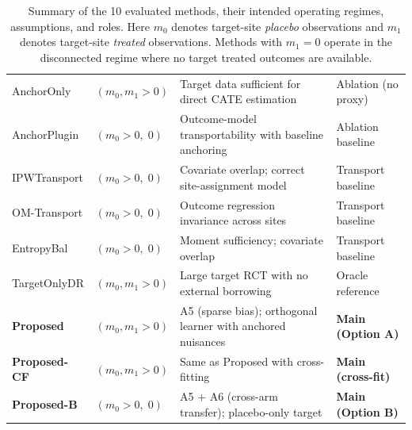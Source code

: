 {{\begin{table}[t]
\begin{tabular}{p{2.8cm} p{2.4cm} p{5.5cm} p{2.8cm}}
AnchorOnly
& $(m_0, m_1 > 0)$
& Target data sufficient for direct CATE estimation
& Ablation (no proxy)
\\

AnchorPlugin
& $(m_0 > 0,\; 0)$
& Outcome-model transportability with baseline anchoring
& Ablation baseline
\\

IPWTransport
& $(m_0 > 0,\; 0)$
& Covariate overlap; correct site-assignment model
& Transport baseline
\\

OM-Transport
& $(m_0 > 0,\; 0)$
& Outcome regression invariance across sites
& Transport baseline
\\

EntropyBal
& $(m_0 > 0,\; 0)$
& Moment sufficiency; covariate overlap
& Transport baseline
\\

TargetOnlyDR
& $(m_0, m_1 > 0)$
& Large target RCT with no external borrowing
& Oracle reference
\\

\textbf{Proposed}
& $(m_0, m_1 > 0)$
& A5 (sparse bias); orthogonal learner with anchored nuisances
& \textbf{Main (Option A)}
\\

\textbf{Proposed-CF}
& $(m_0, m_1 > 0)$
& Same as Proposed with cross-fitting
& \textbf{Main (cross-fit)}
\\

\textbf{Proposed-B}
& $(m_0 > 0,\; 0)$
& A5 + A6 (cross-arm transfer); placebo-only target
& \textbf{Main (Option B)}
\\
\hline
\end{tabular}

\caption{
Summary of the 10 evaluated methods, their intended operating regimes, assumptions, and roles.
Here $m_0$ denotes target-site \emph{placebo} observations and $m_1$ denotes target-site \emph{treated} observations.
Methods with $m_1 = 0$ operate in the disconnected regime where no target treated outcomes are available.
}
\label{tab:methods-regimes}
\end{table}
}

}
